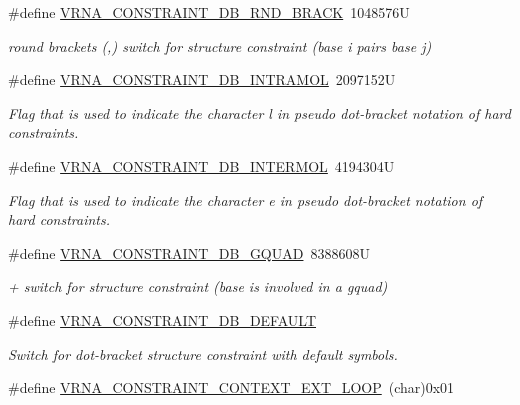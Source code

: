 \begin{DoxyCompactItemize}
\#define \hyperlink{group__hard__constraints_gac17b034852c914bc5879954c65d7e74b}{V\+R\+N\+A\+\_\+\+C\+O\+N\+S\+T\+R\+A\+I\+N\+T\+\_\+\+D\+B\+\_\+\+R\+N\+D\+\_\+\+B\+R\+A\+CK}~1048576U
\begin{DoxyCompactList}\small\item\em round brackets \textquotesingle{}(\textquotesingle{},\textquotesingle{})\textquotesingle{} switch for structure constraint (base i pairs base j) \end{DoxyCompactList}\item 
\#define \hyperlink{group__hard__constraints_ga5c17253f5a39d1d49b0fb11f5196982a}{V\+R\+N\+A\+\_\+\+C\+O\+N\+S\+T\+R\+A\+I\+N\+T\+\_\+\+D\+B\+\_\+\+I\+N\+T\+R\+A\+M\+OL}~2097152U
\begin{DoxyCompactList}\small\item\em Flag that is used to indicate the character \textquotesingle{}l\textquotesingle{} in pseudo dot-\/bracket notation of hard constraints. \end{DoxyCompactList}\item 
\#define \hyperlink{group__hard__constraints_ga31d0ebb9755ca8a4acafc14f00ca755d}{V\+R\+N\+A\+\_\+\+C\+O\+N\+S\+T\+R\+A\+I\+N\+T\+\_\+\+D\+B\+\_\+\+I\+N\+T\+E\+R\+M\+OL}~4194304U
\begin{DoxyCompactList}\small\item\em Flag that is used to indicate the character \textquotesingle{}e\textquotesingle{} in pseudo dot-\/bracket notation of hard constraints. \end{DoxyCompactList}\item 
\#define \hyperlink{group__hard__constraints_ga75cfab03cdc97c95b3ce8bb29f52b08e}{V\+R\+N\+A\+\_\+\+C\+O\+N\+S\+T\+R\+A\+I\+N\+T\+\_\+\+D\+B\+\_\+\+G\+Q\+U\+AD}~8388608U
\begin{DoxyCompactList}\small\item\em \textquotesingle{}+\textquotesingle{} switch for structure constraint (base is involved in a gquad) \end{DoxyCompactList}\item 
\#define \hyperlink{group__hard__constraints_ga1c3864bdc92147a4d93de2b1b4356177}{V\+R\+N\+A\+\_\+\+C\+O\+N\+S\+T\+R\+A\+I\+N\+T\+\_\+\+D\+B\+\_\+\+D\+E\+F\+A\+U\+LT}
\begin{DoxyCompactList}\small\item\em Switch for dot-\/bracket structure constraint with default symbols. \end{DoxyCompactList}\item 
\#define \hyperlink{group__hard__constraints_ga9418eda62a5dec070896702c279d2548}{V\+R\+N\+A\+\_\+\+C\+O\+N\+S\+T\+R\+A\+I\+N\+T\+\_\+\+C\+O\+N\+T\+E\+X\+T\+\_\+\+E\+X\+T\+\_\+\+L\+O\+OP}~(char)0x01\hypertarget{group__hard__constraints_ga9418eda62a5dec070896702c279d2548}{}\label{group__hard__constraints_ga9418eda62a5dec070896702c279d2548}


\end{DoxyCompactItemize}
